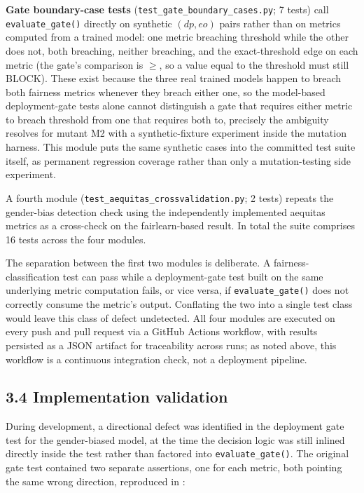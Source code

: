 \documentclass[]{einformatica}
\begin{document}
\textbf{Gate boundary-case tests} (\texttt{test\_gate\_boundary\_cases.py}; 7 tests) call \texttt{evaluate\_gate()} directly on synthetic $(dp, eo)$ pairs rather than on metrics computed from a trained model: one metric breaching threshold while the other does not, both breaching, neither breaching, and the exact-threshold edge on each metric (the gate's comparison is $\geq$, so a value equal to the threshold must still BLOCK). These exist because the three real trained models happen to breach both fairness metrics whenever they breach either one, so the model-based deployment-gate tests alone cannot distinguish a gate that requires either metric to breach threshold from one that requires both to, precisely the ambiguity  resolves for mutant M2 with a synthetic-fixture experiment inside the mutation harness. This module puts the same synthetic cases into the committed test suite itself, as permanent regression coverage rather than only a mutation-testing side experiment.

A fourth module (\texttt{test\_aequitas\_crossvalidation.py}; 2 tests) repeats the gender-bias detection check using the independently implemented aequitas metrics as a cross-check on the fairlearn-based result. In total the suite comprises 16 tests across the four modules.

The separation between the first two modules is deliberate. A fairness-classification test can pass while a deployment-gate test built on the same underlying metric computation fails, or vice versa, if \texttt{evaluate\_gate()} does not correctly consume the metric's output. Conflating the two into a single test class would leave this class of defect undetected. All four modules are executed on every push and pull request via a GitHub Actions workflow, with results persisted as a JSON artifact for traceability across runs; as noted above, this workflow is a continuous integration check, not a deployment pipeline.

\subsection*{3.4 Implementation validation}\label{sec:Method-Validation}

During development, a directional defect was identified in the deployment gate test for the gender-biased model, at the time the decision logic was still inlined directly inside the test rather than factored into \texttt{evaluate\_gate()}. The original gate test contained two separate assertions, one for each metric, both pointing the same wrong direction, reproduced in :
\end{document}
